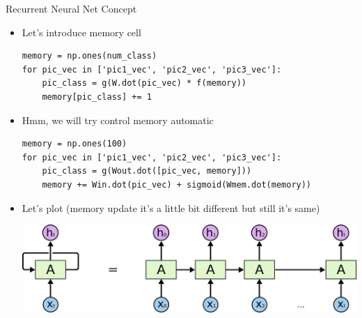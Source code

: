 \documentclass{beamer}
\begin{document}
\begin{frame}[fragile]{Recurrent Neural Net Concept}
	\begin{itemize}
		\item   Let's introduce memory cell 
		 
		\begin{center}
			\begin{verbatim}
memory = np.ones(num_class)
for pic_vec in ['pic1_vec', 'pic2_vec', 'pic3_vec']:
    pic_class = g(W.dot(pic_vec) * f(memory))
    memory[pic_class] += 1
			\end{verbatim}
		\end{center}
		\item   Hmm, we will try control memory automatic
		 
		\begin{center}
			\begin{verbatim}
memory = np.ones(100)
for pic_vec in ['pic1_vec', 'pic2_vec', 'pic3_vec']:
    pic_class = g(Wout.dot([pic_vec, memory]))
    memory += Win.dot(pic_vec) + sigmoid(Wmem.dot(memory))
			\end{verbatim}
		\end{center}
		
		\item  Let's plot (memory update it's a little bit different but still it's same)
		 \begin{center}
			\includegraphics[scale=0.2]{./img/rnn_ur}
		\end{center}
	\end{itemize}
\end{frame}
\end{document}
